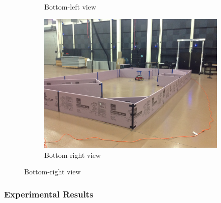 \documentclass[11pt,professionalfonts,hyperref={pdftex,pdfpagemode=none,pdfstartview=FitH}]{beamer}
\begin{document}
\begin{frame}
\begin{figure}
\begin{subfigure}[b]{0.28\textwidth}
        		\caption*{Bottom-left view}
    	\end{subfigure}
	\hspace*{0.03\textwidth}
	\begin{subfigure}[b]{0.28\textwidth}
        		\includegraphics[width=\textwidth]{test_setup_2.jpg}
        		\caption*{Bottom-right view}
    	\end{subfigure}
\end{figure}

\end{frame}

\begin{frame}
\frametitle{Experimental Results}
\end{frame}
\end{document}
